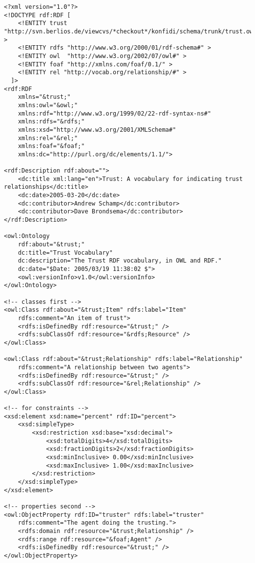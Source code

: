 \begin{verbatim}
<?xml version="1.0"?>
<!DOCTYPE rdf:RDF [
    <!ENTITY trust "http://svn.berlios.de/viewcvs/*checkout*/konfidi/schema/trunk/trust.owl#" >
    <!ENTITY rdfs "http://www.w3.org/2000/01/rdf-schema#" >
    <!ENTITY owl  "http://www.w3.org/2002/07/owl#" >
    <!ENTITY foaf "http://xmlns.com/foaf/0.1/" >
    <!ENTITY rel "http://vocab.org/relationship/#" >
  ]>
<rdf:RDF 
    xmlns="&trust;"
    xmlns:owl="&owl;" 
    xmlns:rdf="http://www.w3.org/1999/02/22-rdf-syntax-ns#" 
    xmlns:rdfs="&rdfs;"
    xmlns:xsd="http://www.w3.org/2001/XMLSchema#"
    xmlns:rel="&rel;"
    xmlns:foaf="&foaf;"
    xmlns:dc="http://purl.org/dc/elements/1.1/">

<rdf:Description rdf:about="">
    <dc:title xml:lang="en">Trust: A vocabulary for indicating trust relationships</dc:title>
    <dc:date>2005-03-20</dc:date>
    <dc:contributor>Andrew Schamp</dc:contributor>
    <dc:contributor>Dave Brondsema</dc:contributor>
</rdf:Description>

<owl:Ontology 
    rdf:about="&trust;" 
    dc:title="Trust Vocabulary" 
    dc:description="The Trust RDF vocabulary, in OWL and RDF." 
    dc:date="$Date: 2005/03/19 11:38:02 $"> 
    <owl:versionInfo>v1.0</owl:versionInfo>
</owl:Ontology>

<!-- classes first -->
<owl:Class rdf:about="&trust;Item" rdfs:label="Item" 
    rdfs:comment="An item of trust">
    <rdfs:isDefinedBy rdf:resource="&trust;" />
    <rdfs:subClassOf rdf:resource="&rdfs;Resource" />
</owl:Class>

<owl:Class rdf:about="&trust;Relationship" rdfs:label="Relationship"
    rdfs:comment="A relationship between two agents">
    <rdfs:isDefinedBy rdf:resource="&trust;" />
    <rdfs:subClassOf rdf:resource="&rel;Relationship" />
</owl:Class>

<!-- for constraints -->
<xsd:element xsd:name="percent" rdf:ID="percent">
    <xsd:simpleType>
        <xsd:restriction xsd:base="xsd:decimal">
            <xsd:totalDigits>4</xsd:totalDigits>
            <xsd:fractionDigits>2</xsd:fractionDigits>
            <xsd:minInclusive> 0.00</xsd:minInclusive>
            <xsd:maxInclusive> 1.00</xsd:maxInclusive>
        </xsd:restriction>
    </xsd:simpleType>
</xsd:element>

<!-- properties second -->
<owl:ObjectProperty rdf:ID="truster" rdfs:label="truster"
    rdfs:comment="The agent doing the trusting.">
    <rdfs:domain rdf:resource="&trust;Relationship" />
    <rdfs:range rdf:resource="&foaf;Agent" />
    <rdfs:isDefinedBy rdf:resource="&trust;" />
</owl:ObjectProperty>


\end{verbatim}
